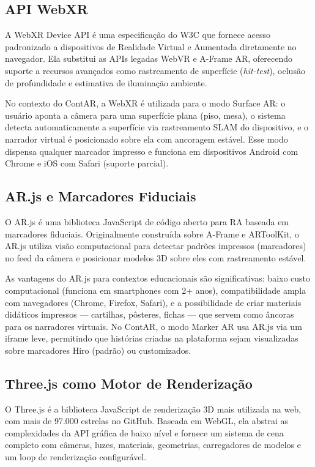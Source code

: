 \documentclass[
  12pt,
  openright,
  twoside,
  a4paper,
  english,
  brazil
]{abntex2}
\begin{document}
\subsection{API WebXR}
\label{subsec:webxr}

A WebXR Device API é uma especificação do W3C que fornece acesso
padronizado a dispositivos de Realidade Virtual e Aumentada diretamente
no navegador. Ela substitui as APIs legadas WebVR e A-Frame AR, oferecendo
suporte a recursos avançados como rastreamento de superfície (\textit{hit-test}),
oclusão de profundidade e estimativa de iluminação ambiente.

No contexto do ContAR, a WebXR é utilizada para o modo Surface AR:
o usuário aponta a câmera para uma superfície plana (piso, mesa), o
sistema detecta automaticamente a superfície via rastreamento SLAM do
dispositivo, e o narrador virtual é posicionado sobre ela com ancoragem
estável. Esse modo dispensa qualquer marcador impresso e funciona em
dispositivos Android com Chrome e iOS com Safari (suporte parcial).

\subsection{AR.js e Marcadores Fiduciais}
\label{subsec:arjs}

O AR.js \cite{arjs} é uma biblioteca JavaScript de código aberto para RA
baseada em marcadores fiduciais. Originalmente construída sobre A-Frame e
ARToolKit, o AR.js utiliza visão computacional para detectar padrões
impressos (marcadores) no feed da câmera e posicionar modelos 3D sobre
eles com rastreamento estável.

As vantagens do AR.js para contextos educacionais são significativas:
baixo custo computacional (funciona em smartphones com 2+ anos),
compatibilidade ampla com navegadores (Chrome, Firefox, Safari),
e a possibilidade de criar materiais didáticos impressos —
cartilhas, pôsteres, fichas — que servem como âncoras para os
narradores virtuais. No ContAR, o modo Marker AR usa AR.js via um iframe
leve, permitindo que histórias criadas na plataforma sejam visualizadas
sobre marcadores Hiro (padrão) ou customizados.

\subsection{Three.js como Motor de Renderização}
\label{subsec:threejs}

O Three.js \cite{threejs} é a biblioteca JavaScript de renderização 3D
mais utilizada na web, com mais de 97.000 estrelas no GitHub. Baseada em
WebGL, ela abstrai as complexidades da API gráfica de baixo nível e
fornece um sistema de cena completo com câmeras, luzes, materiais,
geometrias, carregadores de modelos e um loop de renderização configurável.
\end{document}
